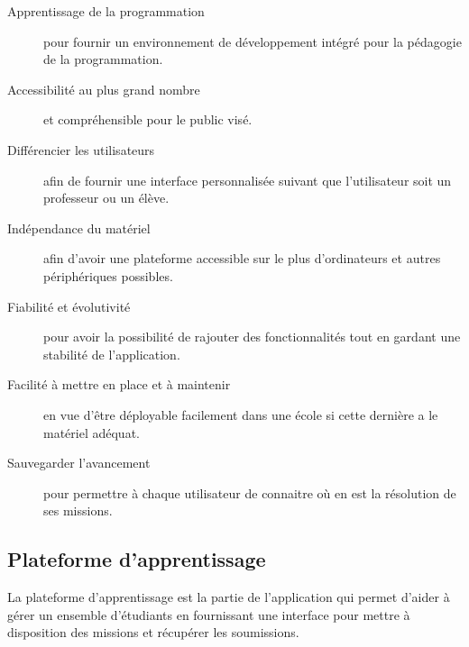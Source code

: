 \begin{description}
  \item[Apprentissage de la programmation] pour fournir un environnement de développement intégré pour la pédagogie de la programmation.
  \item[Accessibilité au plus grand nombre] et compréhensible pour le public visé.
  \item[Différencier les utilisateurs] afin de fournir une interface personnalisée suivant que l'utilisateur soit un professeur ou un élève.
  \item[Indépendance du matériel] afin d'avoir une plateforme accessible sur le plus d'ordinateurs et autres périphériques possibles.
  \item[Fiabilité et évolutivité] pour avoir la possibilité de rajouter des fonctionnalités tout en gardant une stabilité de l'application.
  \item[Facilité à mettre en place et à maintenir] en vue d'être déployable facilement dans une école si cette dernière a le matériel adéquat.
  \item[Sauvegarder l'avancement] pour permettre à chaque utilisateur de connaitre où en est la résolution de ses missions.
\end{description}

\subsection{Plateforme d'apprentissage}
La plateforme d'apprentissage est la partie de l'application qui permet d'aider à gérer un ensemble d'étudiants en fournissant une interface pour mettre à disposition des missions et récupérer les soumissions.

